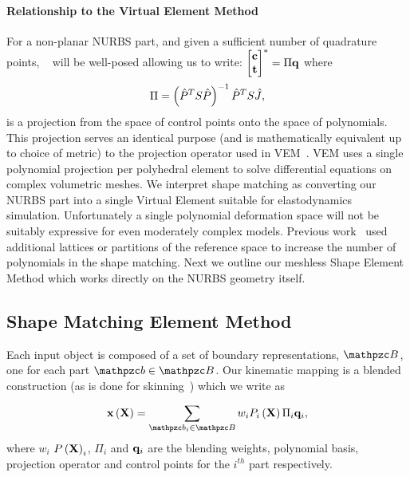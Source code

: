 \paragraph*{Relationship to the Virtual Element Method}
For a non-planar NURBS part, and given a sufficient number of quadrature points, ~ will be well-posed allowing us to write: $\begin{bmatrix} \mathbf{c}\\ \mathbf{t} \end{bmatrix}^* = \Pi\mathbf{q}$ where
\begin{equation*}
    \Pi = \left(\hat{P}^TS\hat{P}\right)^{-1}\hat{P}^TS\hat{J},
\end{equation*} is a projection from the space of control points onto the space of polynomials. 
This projection serves an identical purpose (and is mathematically equivalent up to choice of metric) to the projection operator used in VEM~\cite{10.1142/S021820251440003X}.
VEM uses a single polynomial projection per polyhedral element to solve differential equations on complex volumetric meshes.
We interpret shape matching as converting our NURBS part into a single Virtual Element suitable for elastodynamics simulation.
Unfortunately a single polynomial deformation space will not be suitably expressive for even moderately complex models. 
Previous work~\cite{10.1145/1073204.1073216,10.1145/1275808.1276480} used additional lattices or partitions of the reference space to 
increase the number of polynomials in the shape matching. Next we outline our meshless Shape Element Method which works directly on the NURBS
geometry itself.

\subsection{Shape Matching Element Method}
 Each input object is composed of a set of boundary representations, $\Prts$, one for each part $\prt\in\Prts$. 
 Our kinematic mapping is a blended construction (as is done for skinning~\cite{10.1145/2614028.2615427}) which we write as

 \begin{equation}
    \defX\left(\refX\right) = \sum_{\prt_i\in\Prts} \bld_i\Pmatxi\Pi_i\vc{q}_i, 
 \end{equation} where $w_i$ $P\left(\mathbf{X}\right)_i$, $\Pi_i$ and $\mathbf{q}_i$ are the blending weights, polynomial basis, projection operator and control points for the $i^{th}$
 part respectively.  
 
